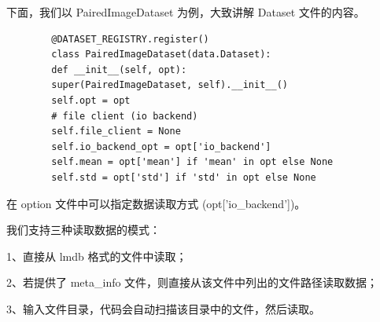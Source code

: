 \documentclass[../main.tex]{subfiles}
\begin{document}
	\begin{table}[h]
		\centering
		\caption{BasicSR 提供的数据处理类}
	\end{table}
	
	下面，我们以 PairedImageDataset 为例，大致讲解 Dataset 文件的内容。
	\begin{verbatim}
		@DATASET_REGISTRY.register()
		class PairedImageDataset(data.Dataset):
		def __init__(self, opt):
		super(PairedImageDataset, self).__init__()
		self.opt = opt
		# file client (io backend)
		self.file_client = None
		self.io_backend_opt = opt['io_backend']
		self.mean = opt['mean'] if 'mean' in opt else None
		self.std = opt['std'] if 'std' in opt else None
	\end{verbatim}
	
	在 option 文件中可以指定数据读取方式 (opt['io\_backend'])。
	
	我们支持三种读取数据的模式：
	
	1、直接从 lmdb 格式的文件中读取；
	
	2、若提供了 meta\_info 文件，则直接从该文件中列出的文件路径读取数据；
	
	3、输入文件目录，代码会自动扫描该目录中的文件，然后读取。
	
\end{document}
